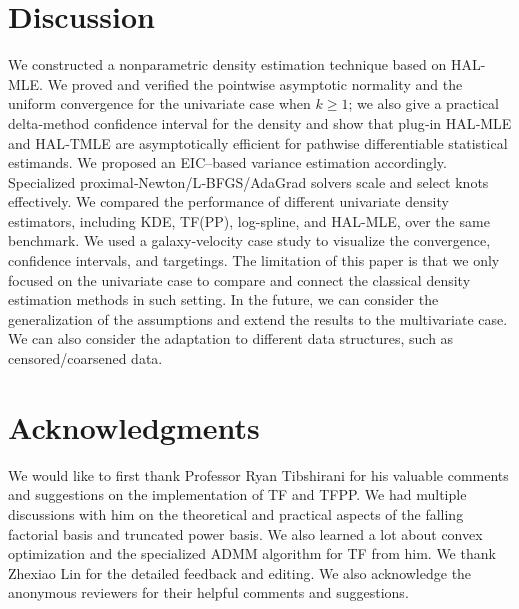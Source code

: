 \section{Discussion} \label{sec:discussion}
We constructed a nonparametric density estimation technique based on HAL-MLE. We proved and verified the pointwise asymptotic normality and the uniform convergence for the univariate case when \(k\ge1\); we also give a practical delta‑method confidence interval for the density and show that plug‑in HAL‑MLE and HAL‑TMLE are asymptotically efficient for pathwise differentiable statistical estimands. We proposed an EIC–based variance estimation accordingly. Specialized proximal‑Newton/L‑BFGS/AdaGrad solvers scale and select knots effectively. We compared the performance of  different univariate density estimators, including KDE, TF(PP), log-spline, and HAL-MLE, over the same benchmark. We used a galaxy‑velocity case study to visualize the convergence, confidence intervals, and targetings. The limitation of this paper is that we only focused on the univariate case to compare and connect the classical density estimation methods in such setting. In the future, we can consider the generalization of the assumptions and extend the results to the multivariate case. We can also consider the adaptation to different data structures, such as censored/coarsened data.


\section{Acknowledgments} \label{sec:acknowledgments}
We would like to first thank Professor Ryan Tibshirani for his valuable comments and suggestions on the implementation of TF and TFPP. We had multiple discussions with him on the theoretical and practical aspects of the falling factorial basis and truncated power basis. We also learned a lot about convex optimization and the specialized ADMM algorithm for TF from him. We thank Zhexiao Lin for the detailed feedback and editing. We also acknowledge the anonymous reviewers for their helpful comments and suggestions. 



